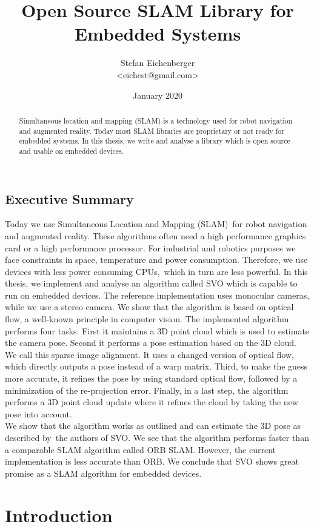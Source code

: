 \documentclass[11pt,a4paper,titlepage,oneside]{report}
\title{Open Source SLAM Library for Embedded Systems}
\author{Stefan Eichenberger\\<eichest@gmail.com>}
\date{January 2020}
\begin{document}
\maketitle
\begin{abstract}
  Simultaneous location and mapping (SLAM) is a technology used for robot navigation and augmented reality. Today most SLAM libraries are proprietary or not ready for embedded systems. In this thesis, we write and analyse a library which is open source and usable on embedded devices.
\end{abstract}

\section*{Executive Summary}
Today we use Simultaneous Location and Mapping (SLAM) for robot navigation and augmented reality. These algorithms often need a high performance graphics card or a high performance processor. For industrial and robotics purposes we face constraints in space, temperature and power consumption. Therefore, we use devices with less power consuming CPUs, which in turn are less powerful. In this thesis, we implement and analyse an algorithm called SVO which is capable to run on embedded devices. The reference implementation uses monocular cameras, while we use a stereo camera. We show that the algorithm is based on optical flow, a well-known principle in computer vision. The implemented algorithm performs four tasks. First it maintains a 3D point cloud which is used to estimate the camera pose. Second it performs a pose estimation based on the 3D cloud. We call this sparse image alignment. It uses a changed version of optical flow, which directly outputs a pose instead of a warp matrix. Third, to make the guess more accurate, it refines the pose by using standard optical flow, followed by a minimization of the re-projection error. Finally, in a last step, the algorithm performs a 3D point cloud update where it refines the cloud by taking the new pose into account.\\
We show that the algorithm works as outlined and can estimate the 3D pose as described by the authors of SVO. We see that the algorithm performs faster than a comparable SLAM algorithm called ORB SLAM. However, the current implementation is less accurate than ORB. We conclude that SVO shows great promise as a SLAM algorithm for embedded devices.

\tableofcontents

\chapter{Introduction}
\end{document}
